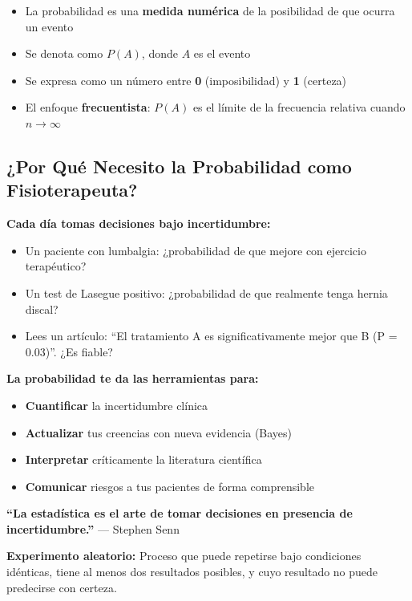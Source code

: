 \documentclass[
  letterpaper,
  DIV=11,
  numbers=noendperiod]{scrartcl}
\providecommand{\tightlist}{%
  \setlength{\itemsep}{0pt}\setlength{\parskip}{0pt}}
\begin{document}
\begin{itemize}
\tightlist
\item
  La probabilidad es una \textbf{medida numérica} de la posibilidad de
  que ocurra un evento
\item
  Se denota como \(P(A)\), donde \(A\) es el evento
\item
  Se expresa como un número entre \textbf{0} (imposibilidad) y
  \textbf{1} (certeza)
\item
  El enfoque \textbf{frecuentista}: \(P(A)\) es el límite de la
  frecuencia relativa cuando \(n \to \infty\)
\end{itemize}

\subsection{¿Por Qué Necesito la Probabilidad como
Fisioterapeuta?}\label{por-que-necesito-la-probabilidad-como-fisioterapeuta}

\textbf{Cada día tomas decisiones bajo incertidumbre:}

\begin{itemize}
\tightlist
\item
  Un paciente con lumbalgia: ¿probabilidad de que mejore con ejercicio
  terapéutico?
\item
  Un test de Lasegue positivo: ¿probabilidad de que realmente tenga
  hernia discal?
\item
  Lees un artículo: ``El tratamiento A es significativamente mejor que B
  (P = 0.03)''. ¿Es fiable?
\end{itemize}

\textbf{La probabilidad te da las herramientas para:}

\begin{itemize}
\tightlist
\item
  \textbf{Cuantificar} la incertidumbre clínica
\item
  \textbf{Actualizar} tus creencias con nueva evidencia (Bayes)
\item
  \textbf{Interpretar} críticamente la literatura científica
\item
  \textbf{Comunicar} riesgos a tus pacientes de forma comprensible
\end{itemize}

\textbf{``La estadística es el arte de tomar decisiones en presencia de
incertidumbre.''} --- Stephen Senn

\textbf{Experimento aleatorio:} Proceso que puede repetirse bajo
condiciones idénticas, tiene al menos dos resultados posibles, y cuyo
resultado no puede predecirse con certeza.
\end{document}
